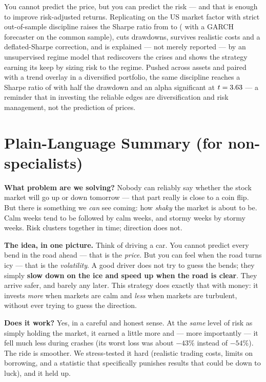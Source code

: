 \documentclass[11pt]{article}
\begin{document}
You cannot predict the price, but you can predict the risk --- and that is enough
to improve risk-adjusted returns. Replicating \citet{moreira2017volatility} on
the US market factor with strict out-of-sample discipline raises the Sharpe ratio
from \sharpeBH{} to \sharpeManaged{} (\sharpeBest{} with a GARCH forecaster on the
common sample), cuts drawdowns, survives realistic costs and a deflated-Sharpe
correction, and is
explained --- not merely reported --- by an unsupervised regime model that
rediscovers the crises and shows the strategy earning its keep by sizing risk to
the regime. Pushed across \nAssets{} assets and paired with a trend overlay in a
diversified portfolio, the same discipline reaches a Sharpe ratio of
\sharpeDivTrend{} with half the drawdown and an alpha significant at
$t=3.63$ --- a reminder that in investing the reliable edges are
diversification and risk management, not the prediction of prices.




\clearpage
\appendix
\section{Plain-Language Summary (for non-specialists)}

\textbf{What problem are we solving?} Nobody can reliably say whether the stock
market will go up or down tomorrow --- that part really is close to a coin flip.
But there is something we \emph{can} see coming: how \emph{shaky} the market is
about to be. Calm weeks tend to be followed by calm weeks, and stormy weeks by
stormy weeks. Risk clusters together in time; direction does not.

\textbf{The idea, in one picture.} Think of driving a car. You cannot predict
every bend in the road ahead --- that is the \emph{price}. But you can feel when
the road turns icy --- that is the \emph{volatility}. A good driver does not try
to guess the bends; they simply \textbf{slow down on the ice and speed up when
the road is clear}. They arrive safer, and barely any later. This strategy does
exactly that with money: it invests \emph{more} when markets are calm and
\emph{less} when markets are turbulent, without ever trying to guess the
direction.

\textbf{Does it work?} Yes, in a careful and honest sense. At the \emph{same}
level of risk as simply holding the market, it earned a little more and ---
more importantly --- it fell much less during crashes (its worst loss was about
$-43\%$ instead of $-54\%$). The ride is smoother. We stress-tested it hard
(realistic trading costs, limits on borrowing, and a statistic that specifically
punishes results that could be down to luck), and it held up.
\end{document}

